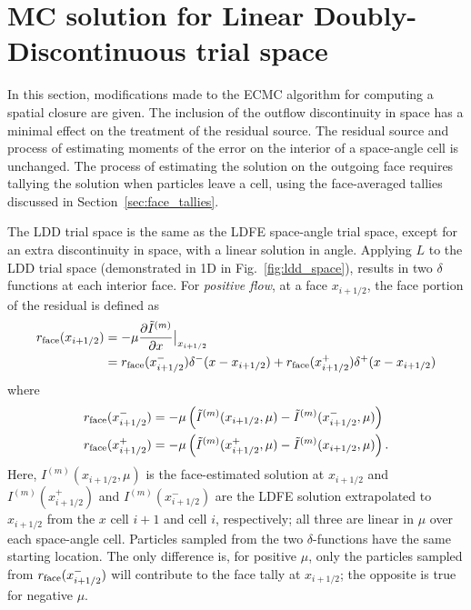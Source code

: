 \section{MC solution for Linear Doubly-Discontinuous trial space}
\label{sec:ldd_mc}

In this section, modifications made to the ECMC algorithm for computing a spatial closure
are given.  The inclusion of the outflow discontinuity in space has a minimal effect on the treatment of the
residual source. The residual source and process of estimating moments of
the error on the interior of a space-angle cell is unchanged.  The process of estimating
the solution on the outgoing face requires tallying the solution when particles leave a
cell, using the face-averaged tallies discussed in Section~\ref{sec:face_tallies}.  

The LDD trial space is the same as the LDFE space-angle trial space, except for an extra discontinuity in space, with a linear solution
in angle.  Applying $L$ to the LDD trial space (demonstrated in 1D in
Fig.~\ref{fig:ldd_space}), results in two $\delta$ functions at each interior face.
For \emph{positive flow}, at a face $x_{i+1/2}$, the face portion of the residual is defined as
\begin{align}
    \label{eq:res_face}
    r_{\text{face}}(x_{i+1/2}) &= -\mu \frac{\partial \tilde I^{(m)}}{\partial x}\big|_{x_{i+1/2}}\\
    &= r_{\text{face}}(x_{i+1/2}^-)\delta^-(x - x_{i+1/2}) + r_{\text{face}}(x_{i+1/2}^+)\delta^+(x - x_{i+1/2}) 
\end{align}
where
\begin{align}
    r_{\text{face}}(x_{i+1/2}^-) &= -\mu\left( \tilde I^{(m)}(x_{i+1/2},\mu) - \tilde I^{(m)}(x_{i+1/2}^-,\mu)
           \right)\\
    r_{\text{face}}(x_{i+1/2}^+) &= -\mu\left( \tilde I^{(m)}(x_{i+1/2}^+,\mu) -
           \tilde I^{(m)}(x_{i+1/2},\mu)
           \right).
\end{align}
Here, $I^{(m)}(x_{i+1/2},\mu)$ is the face-estimated solution at $x_{i+1/2}$ and
$I^{(m)}(x_{i+1/2}^+)$ and $I^{(m)}(x_{i+1/2}^-)$ are the LDFE solution extrapolated to
$x_{i+1/2}$ from the $x$ cell $i+1$ and cell $i$, respectively; all three are linear in
$\mu$ over each space-angle cell.  Particles sampled from the
two $\delta$-functions have the same starting location.  The only difference is, for
positive $\mu$, only the particles sampled from $r_{\text{face}}(x^-_{i+1/2})$ will contribute to the face
tally at $x_{i+1/2}$; the opposite is true for negative $\mu$.  

